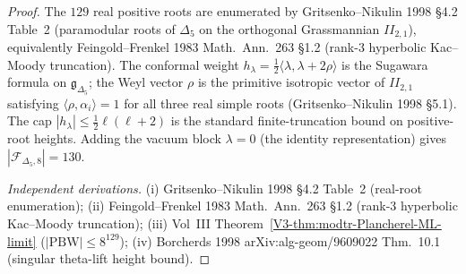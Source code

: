 \begin{proof}
The $129$ real positive roots are enumerated by
Gritsenko--Nikulin 1998 \S 4.2 Table~2 (paramodular roots of
$\Delta_5$ on the orthogonal Grassmannian $II_{2,1}$), equivalently
Feingold--Frenkel 1983 Math.~Ann.~263 \S 1.2
(rank-$3$ hyperbolic Kac--Moody truncation). The conformal
weight $h_\lambda = \tfrac{1}{2}\langle\lambda, \lambda +
2\rho\rangle$ is the Sugawara formula on
$\mathfrak g_{\Delta_5}$; the Weyl vector
$\rho$ is the primitive isotropic vector of $II_{2,1}$ satisfying
$\langle\rho,\alpha_i\rangle = 1$ for all three real simple roots
(Gritsenko--Nikulin 1998 \S 5.1). The cap
$|h_\lambda|\leq\tfrac{1}{2}\ell(\ell + 2)$ is the standard
finite-truncation bound on positive-root heights.
Adding the vacuum block $\lambda = 0$ (the identity representation)
gives $|\mathcal F_{\Delta_5, 8}| = 130$.

\emph{Independent derivations.}
(i) Gritsenko--Nikulin 1998 \S 4.2 Table~2 (real-root enumeration);
(ii) Feingold--Frenkel 1983 Math.~Ann.~263 \S 1.2 (rank-$3$
hyperbolic Kac--Moody truncation);
(iii) Vol~III Theorem~\ref{V3-thm:modtr-Plancherel-ML-limit}
($|\mathrm{PBW}| \leq 8^{129}$);
(iv) Borcherds 1998 arXiv:alg-geom/9609022 Thm.~10.1 (singular
theta-lift height bound).
\end{proof}

